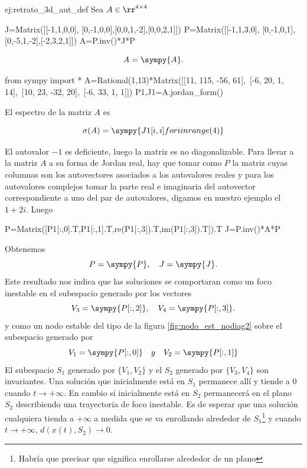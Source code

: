 \begin{ejemplo}{ej:retrato_3d_aut_def} Sea $A\in\rr^{4\times 4}$ 
 
 \begin{sympycode}
J=Matrix([[-1,1,0,0], [0,-1,0,0],[0,0,1,-2],[0,0,2,1]])
P=Matrix([[-1,1,3,0], [0,-1,0,1],[0,-5,1,-2],[-2,3,2,1]])
A=P.inv()*J*P
 \end{sympycode}

 \[
  A=\sympy{A}.
 \]

 \begin{sympyblock}[][numbers=left,frame=single,framesep=5mm]
from sympy import *
A=Rational(1,13)*Matrix([[11, 115, -56, 61],\
    [-6, 20, 1, 14],\
    [10, 23, -32, 20],\
    [-6, 33, 1, 1]])
P1,J1=A.jordan_form()
\end{sympyblock}
 
 

El espectro de la matriz $A$ es 

$$\sigma(A)=\sympy{ {J1[i,i] for i in range(4)} }$$

El autovalor $-1$ es deficiente, luego la matriz es no diagonalizable. Para llevar a la matriz $A$ a su forma de Jordan real, hay que tomar como $P$ la matriz cuyas columnas son los autovectores asociados a los autovalores reales y para los autovalores complejos tomar la parte real e imaginaria del autovector correspondiente a uno del par de autovalores, digamos en nuestro ejemplo el $1+2i$. Luego

\begin{sympyblock}[][numbers=left,frame=single,framesep=5mm]
P=Matrix([P1[:,0].T,P1[:,1].T,re(P1[:,3]).T,im(P1[:,3]).T]).T
J=P.inv()*A*P
\end{sympyblock} 

Obtenemos
\[
 P=\sympy{P},\quad J=\sympy{J}. 
\]
Este resultado nos indica que las soluciones se comportaran como un foco inestable en el subespacio generado por los vectores
\[
 V_3=\sympy{P[:,2]}, \quad V_4=\sympy{P[:,3]}.
\]
y como un nodo estable del tipo de la figura \ref{fig:nodo_est_nodiag2} sobre el subespacio generado por 
\[
 V_1=\sympy{P[:,0]}\quad{y}\quad V_2=\sympy{P[:,1]}
\]
 El subespacio $S_1$ generado por $\{V_1,V_2\}$ y el $S_2$ generado por $\{V_3,V_4\}$ son invariantes. Una solución que inicialmente está en $S_1$ permanece allí y tiende a $0$ cuando $t\to +\infty$. En cambio si inicialmente está en $S_2$ permanecerá en el plano $S_2$ describiendo una trayectoria de foco inestable.  Es de esperar que una solución cualquiera tienda a $+\infty$ a medida que se va enrollando alrededor de $S_1$\footnote{Habría que precisar que significa enrollarse alrededor de un plano} y cuando $t\to +\infty$, $d(x(t),S_2)\to 0$.


\end{ejemplo}
